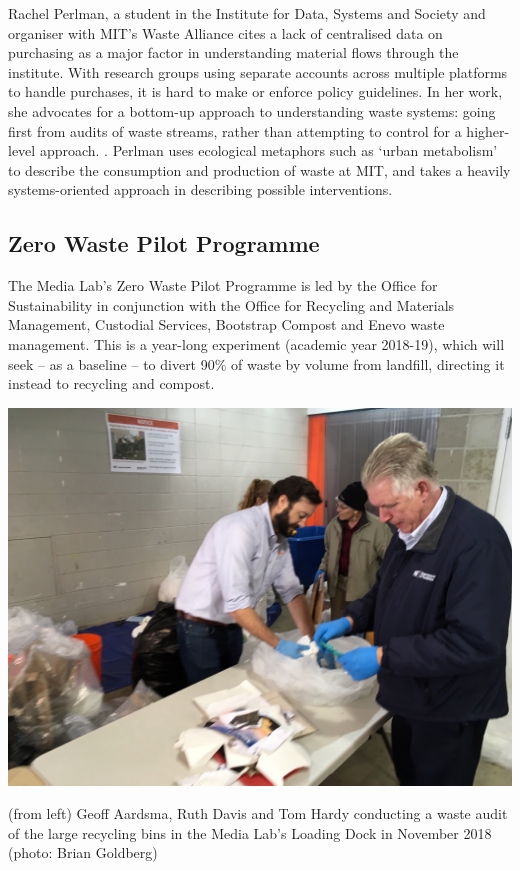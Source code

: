 \documentclass[nofonts,nols,justified,nobib]{tufte-book}
\begin{document}
Rachel Perlman, a student in the Institute for Data, Systems and Society and organiser with MIT's Waste Alliance cites a lack of centralised data on purchasing as a major factor in understanding material flows through the institute. With research groups using separate accounts across multiple platforms to handle purchases, it is hard to make or enforce policy guidelines. In her work, she advocates for a bottom-up approach to understanding waste systems: going first from audits of waste streams, rather than attempting to control for a higher-level approach. \cite{perlman_material_2016}. Perlman uses ecological metaphors such as `urban metabolism' to describe the consumption and production of waste at MIT, and takes a heavily systems-oriented approach in describing possible interventions.


\subsection*{Zero Waste Pilot Programme}

The Media Lab's Zero Waste Pilot Programme is led by the Office for Sustainability in conjunction with the Office for Recycling and Materials Management, Custodial Services, Bootstrap Compost and Enevo waste management. This is a year-long experiment (academic year 2018-19), which will seek -- as a baseline -- to divert 90\% of waste by volume from landfill, directing it instead to recycling and compost. 

\begin{marginfigure}
\includegraphics[width=\textwidth]{img/2/lab-audit.jpg}
\caption{(from left) Geoff Aardsma, Ruth Davis and Tom Hardy conducting a waste audit of the large recycling bins in the Media Lab's Loading Dock in November 2018 (photo: Brian Goldberg)}
\end{marginfigure}
\end{document}
